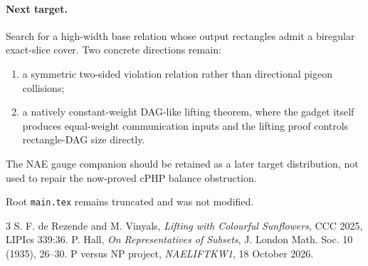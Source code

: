 \documentclass[11pt]{article}
\begin{document}
\paragraph{Next target.}
Search for a high-width base relation whose output rectangles admit a biregular exact-slice cover. Two concrete directions remain:
\begin{enumerate}
\item a symmetric two-sided violation relation rather than directional pigeon collisions;
\item a natively constant-weight DAG-like lifting theorem, where the gadget itself produces equal-weight communication inputs and the lifting proof controls rectangle-DAG size directly.
\end{enumerate}
The NAE gauge companion should be retained as a later target distribution, not used to repair the now-proved cPHP balance obstruction.

Root \texttt{main.tex} remains truncated and was not modified.

\begin{thebibliography}{3}
 S. F. de Rezende and M. Vinyals, \emph{Lifting with Colourful Sunflowers}, CCC 2025, LIPIcs 339:36.
 P. Hall, \emph{On Representatives of Subsets}, J. London Math. Soc. 10 (1935), 26--30.
 P versus NP project, \emph{NAELIFTKW1}, 18 October 2026.
\end{thebibliography}
\end{document}
